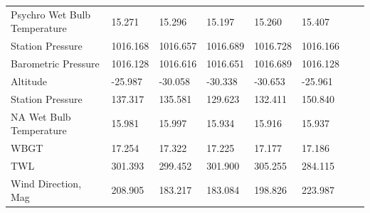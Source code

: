 \documentclass[a4paper,12pt]{article} %
\begin{document}
\begin{enumerate}
\begin{table}[H]
\begin{tabular}{llllllll}
Psychro Wet Bulb Temperature             &15.271          &15.296                     &15.197             &15.260            & 15.407 \\
Station Pressure             &1016.168          &1016.657                 &1016.689             &1016.728            & 1016.166 \\
Barometric Pressure             &1016.128          &1016.616                &1016.651             &1016.689            & 1016.128 \\
Altitude             &-25.987          &-30.058                 &-30.338             &-30.653            & -25.961 \\
Station Pressure             &137.317          &135.581                 &129.623             &132.411            & 150.840 \\
NA Wet Bulb Temperature             &15.981          &15.997                 &15.934             &15.916            & 15.937 \\
WBGT             &17.254          &17.322                     &17.225             &17.177            & 17.186 \\
TWL             &301.393        &299.452                     &301.900             &305.255            & 284.115 \\
Wind Direction, Mag                 & 208.905               & 183.217               & 183.084             & 198.826            & 223.987 

\end{tabular}
\label{mean-table}
\end{table}


\end{enumerate}
\end{document}
